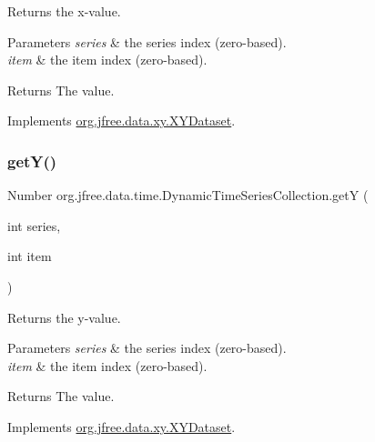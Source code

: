 Returns the x-\/value.


\begin{DoxyParams}{Parameters}
{\em series} & the series index (zero-\/based). \\
\hline
{\em item} & the item index (zero-\/based).\\
\hline
\end{DoxyParams}
\begin{DoxyReturn}{Returns}
The value. 
\end{DoxyReturn}


Implements \mbox{\hyperlink{interfaceorg_1_1jfree_1_1data_1_1xy_1_1_x_y_dataset_a85c75ba5b69b551e96afd29d1732ba22}{org.\+jfree.\+data.\+xy.\+X\+Y\+Dataset}}.

\mbox{\label{classorg_1_1jfree_1_1data_1_1time_1_1_dynamic_time_series_collection_a478c24e8f03cfbedd6464ea36d5d15f3}} 
\subsubsection{\texorpdfstring{get\+Y()}{getY()}}
{\footnotesize\ttfamily Number org.\+jfree.\+data.\+time.\+Dynamic\+Time\+Series\+Collection.\+getY (\begin{DoxyParamCaption}\item[{int}]{series,  }\item[{int}]{item }\end{DoxyParamCaption})}

Returns the y-\/value.


\begin{DoxyParams}{Parameters}
{\em series} & the series index (zero-\/based). \\
\hline
{\em item} & the item index (zero-\/based).\\
\hline
\end{DoxyParams}
\begin{DoxyReturn}{Returns}
The value. 
\end{DoxyReturn}


Implements \mbox{\hyperlink{interfaceorg_1_1jfree_1_1data_1_1xy_1_1_x_y_dataset_aa915867221e0f94021bad3140db5254e}{org.\+jfree.\+data.\+xy.\+X\+Y\+Dataset}}.

